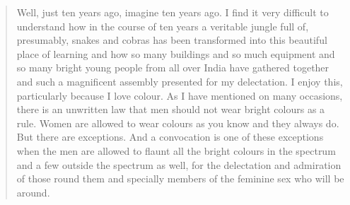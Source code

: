 \begin{quote}
{Well, just ten years ago, imagine ten years ago. I find it very difficult to understand how in the course of ten years a veritable jungle full of, presumably, snakes and cobras has been transformed into this beautiful place of learning and how so many buildings and so much equipment and so many bright young people from all over India have gathered together and such a magnificent assembly presented for my delectation. I enjoy this, particularly because I love colour. As I have mentioned on many occasions, there is an unwritten law that men should not wear bright colours as a rule. Women are allowed to wear colours as you know and they always do. But there are exceptions. And a convocation is one of these exceptions when the men are allowed to flaunt all the bright colours in the spectrum and a few outside the spectrum as well, for the delectation and admiration of those round them and specially members of the feminine sex who will be around.
}\relax
\end{quote}

